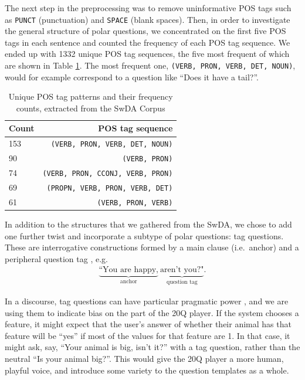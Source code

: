 \documentclass[11pt,a4paper]{article}
\begin{document}
The next step in the preprocessing was to remove uninformative POS tags such as \texttt{PUNCT} (punctuation) and \texttt{SPACE} (blank spaces).
Then, in order to investigate the general structure of polar questions, we concentrated on the first five POS tags in each sentence and counted the frequency of each POS tag sequence.
We ended up with 1332 unique POS tag sequences, the five most frequent of which are shown in Table \ref{tab:pos_patterns}.
The most frequent one, \texttt{(VERB, PRON, VERB, DET, NOUN)}, would for example correspond to a question like ``Does it have a tail?''.

\begin{table}
\centering
{\small
\begin{tabular}{lr}
	\toprule
	Count & POS tag sequence \\ \midrule
    153 & \texttt{(VERB, PRON, VERB, DET, NOUN)}\\
	90 & \texttt{(VERB, PRON)}\\
	74 & \texttt{(VERB, PRON, CCONJ, VERB, PRON)}\\
	69 & \texttt{(PROPN, VERB, PRON, VERB, DET)}\\
	61 & \texttt{(VERB, PRON, VERB)}\\
	\bottomrule
\end{tabular}
}
\caption{Unique POS tag patterns and their frequency counts, extracted from the SwDA Corpus}
\label{tab:pos_patterns}
\end{table}

In addition to the structures that we gathered from the SwDA, we chose to add one further twist and incorporate a subtype of polar questions: tag questions.
These are interrogative constructions formed by a main clause (i.e.\ anchor) and a peripheral question tag \citep{Bawden2017, Bonsignori2007, TottieEa2006}, e.g. 
\begin{gather*}
    \underbrace{\text{``You are happy,}}_{\text{anchor}}\ \underbrace{\text{aren't you?"}}_{\text{question tag}}. 
\end{gather*}

In a discourse, tag questions can have particular pragmatic power \citep{TottieEa2006}, and we are using them to indicate bias on the part of the 20Q player.
If the system chooses a feature, it might expect that the user's answer of whether their animal has that feature will be ``yes'' if most of the values for that feature are 1.
In that case, it might ask, say, ``Your animal is big, isn't it?'' with a tag question, rather than the neutral ``Is your animal big?''.
This would give the 20Q player a more human, playful voice, and introduce some variety to the question templates as a whole.
\end{document}
